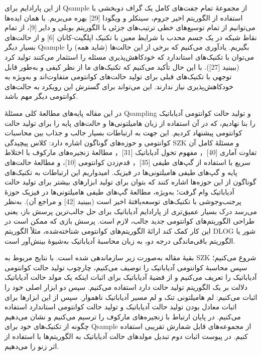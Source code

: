 از این پارادایم برای Qsample از مجموعهٔ تمام جفت‌های کامل یک گراف دوبخشی با استفاده از الگوریتم اخیر جروم، سینکلر و ویگودا [29] بهره می‌بریم. با همان ایده‌ها می‌توانیم از تمام توسیع‌های خطی ترتیب‌های جزئی با الگوریتم بوبلی و دایر [9]، از تمام نقاط شبکه در یک جسم محدب با شرایط معین با تکنیک اپلگیت-کانان [6] و از حالت‌های بسیار دیگر Qsample بگیریم. یادآوری می‌کنیم که برخی از این حالت‌ها (شاید همه) را می‌توان با تکنیک‌های استاندارد که خودکاهش‌پذیری مسئله را استثمار می‌کنند تولید کرد (ببینید [27]). با این حال تأکید می‌کنیم که تکنیک‌های ما از نظر کیفی و به‌طور قابل توجهی با تکنیک‌های قبلی برای تولید حالت‌های کوانتومی متفاوت‌اند و به‌ویژه به خودکاهش‌پذیری نیاز ندارند. این می‌تواند برای گسترش این رویکرد به حالت‌های کوانتومی دیگر مهم باشد.

در این مقاله پایه‌های مطالعهٔ کلی مسئلهٔ Qsampling و تولید حالت کوانتومی آدیاباتیک را بنا نهادیم، که در آن استفاده از زبان هامیلتونی‌ها و حالت‌های پایه را برای تولید حالت کوانتومی پیشنهاد کردیم. این جهت به ارتباطات بسیار جالب و جذاب بین محاسبات کوانتومی و حوزه‌های گوناگون اشاره دارد: کلاس پیچیدگی SZK و مسئلهٔ کامل آن تفاوت آماری [40]， مفهوم تحول آدیاباتیک [31]， مطالعهٔ زنجیره‌های مارکوف با اختلاط سریع با استفاده از گپ‌های طیفی [35]， قدم‌زدن کوانتومی [10]، و مطالعهٔ حالت‌های پایه و گپ‌های طیفی هامیلتونی‌ها در فیزیک. امیدواریم این ارتباطات به تکنیک‌های گوناگون از این حوزه‌ها اشاره کنند که بتوان برای تولید ابزارهای بیشتر برای تولید حالت آدیاباتیک وام گرفت؛ به‌ویژه، مطالعهٔ گپ‌های طیفی هامیلتونی‌ها در فیزیک حوزهٔ پرجنب‌وجوشی با تکنیک‌های توسعه‌یافتهٔ اخیر است (ببینید [42] و مراجع آن). به‌نظر می‌رسد درک بسیار عمیق‌تری از پارادایم آدیاباتیک برای حل جالب‌ترین پرسش باز، یعنی طراحی الگوریتم‌های کوانتومی جدید جالب، لازم است. پرسش بازی که ممکن است در این کار کمک کند ارائهٔ الگوریتم‌های کوانتومی شناخته‌شده، مثلاً الگوریتم DLOG شور یا الگوریتم باقی‌ماندگی درجه دو، به زبان محاسبهٔ آدیاباتیک به‌شیوهٔ بینش‌آور است.

بقیهٔ مقاله به‌صورت زیر سازماندهی شده است. با نتایج مربوط به SZK شروع می‌کنیم؛ سپس محاسبهٔ کوانتومی آدیاباتیک را توصیف می‌کنیم، چارچوب تولید حالت کوانتومی آدیاباتیک را تعریف می‌کنیم و از قضیهٔ آدیاباتیک برای اثبات اینکه یک مولد حالت آدیاباتیک دلالت بر یک الگوریتم تولید حالت دارد استفاده می‌کنیم. سپس دو ابزار اصلی خود را اثبات می‌کنیم: لم هامیلتونی تنک و لم مسیر آدیاباتیک ناهموار. سپس از این ابزارها برای اثبات معادل بودن تولید حالت آدیاباتیک و تولید حالت کوانتومی استاندارد استفاده می‌کنیم. در پایان ارتباط با زنجیره‌های مارکوف را ترسیم می‌کنیم و نشان می‌دهیم چگونه از تکنیک‌های خود برای Qsample از مجموعه‌های قابل شمارش تقریبی استفاده کنیم. در پیوست اثبات دوم تبدیل مولدهای حالت آدیاباتیک به الگوریتم‌ها با استفاده از اثر زنو را می‌دهیم.

